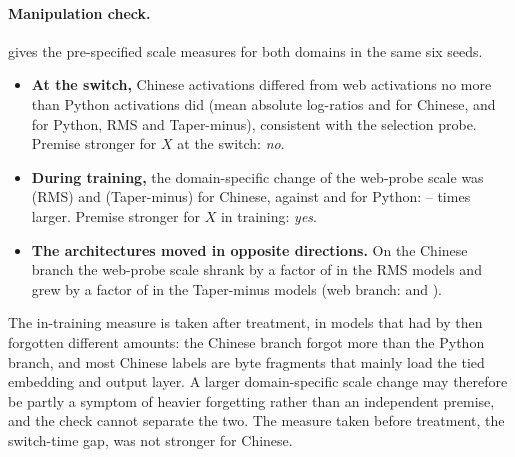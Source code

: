 \documentclass[11pt]{article}
\begin{document}
\paragraph{Manipulation check.}  gives the pre-specified scale measures for both domains in
the same six seeds.
\begin{itemize}[leftmargin=1.4em,itemsep=2pt]
  \item \textbf{At the switch,} Chinese activations differed from web activations no more than Python activations
        did (mean absolute log-ratios \mcGapXR{} and \mcGapXT{} for Chinese, \mcGapPyR{} and \mcGapPyT{} for Python,
        RMS and Taper-minus), consistent with the selection probe. Premise stronger for $X$ at the switch:
        \emph{no}.
  \item \textbf{During training,} the domain-specific change of the web-probe scale was \mcSpecXR{} (RMS) and
        \mcSpecXT{} (Taper-minus) for Chinese, against \mcSpecPyR{} and \mcSpecPyT{} for Python:
        \mcRatioLo--\mcRatioHi{} times larger. Premise stronger for $X$ in training: \emph{yes}.
  \item \textbf{The architectures moved in opposite directions.} On the Chinese branch the web-probe scale shrank by
        a factor of \mcXfactorR{} in the RMS models and grew by a factor of \mcXfactorT{} in the Taper-minus models
        (web branch: \mcWebFactorR{} and \mcWebFactorT).
\end{itemize}
The in-training measure is taken after treatment, in models that had by then forgotten different amounts: the
Chinese branch forgot more than the Python branch, and most Chinese labels are byte fragments that mainly load
the tied embedding and output layer. A larger domain-specific scale change may therefore be partly a symptom of
heavier forgetting rather than an independent premise, and the check cannot separate the two. The measure taken
before treatment, the switch-time gap, was not stronger for Chinese.

\begin{table}[t]
\centering
\small
\caption{Manipulation check (pre-specified, descriptive): scales of the activations entering the 12 internal
normalizers, as natural-log ratios, for Chinese ($X$) and Python in the same six seeds. ``Switch gap'' compares
the domain's probe with the web probe at the switch. The branch rows give the change of the web-probe scale from
the switch to the end of the web branch or of the shifted (Chinese or Python) branch, so the web-branch row is the
same for both domains. ``Domain-specific change'' is the shifted-branch change minus the web-branch change, per
site and seed (bold: the in-training premise). Rows marked $|\cdot|$ average the absolute log-ratio over 12 sites
$\times$ 6 seeds; the signed row is a plain mean, with its multiplicative factor.}
\label{tab:s2scales}
\setlength{\tabcolsep}{4pt}

\end{table}
\end{document}
